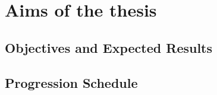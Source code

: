 \chapter{Aims of the thesis}
\label{ch:aim}




\section{Objectives and Expected Results}
\label{sec:objectives}









\section{Progression Schedule}
